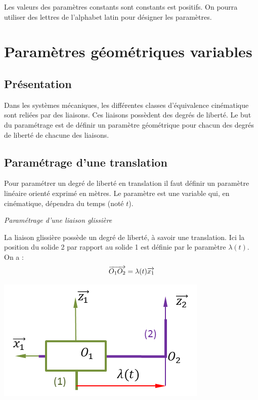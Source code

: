 \documentclass[10pt,oneside]{article}
\begin{document}
\begin{rem}
Les valeurs des paramètres constants sont constants est positifs. On pourra utiliser des lettres de l'alphabet latin pour désigner les paramètres. 
\end{rem}

\section{Paramètres géométriques variables}
\subsection{Présentation}
\begin{defi}
Dans les systèmes mécaniques, les différentes classes d'équivalence cinématique sont reliées par des liaisons. Ces liaisons possèdent des degrés de liberté. Le but du paramétrage est de définir un paramètre géométrique pour chacun des degrés de liberté de chacune des liaisons. 
\end{defi}

\subsection{Paramétrage d'une translation}

\begin{methode}
Pour paramétrer un degré de liberté en translation il faut définir un paramètre linéaire orienté exprimé en mètres. Le paramètre est une variable qui, en cinématique, dépendra du temps (noté $t$).
\end{methode}

\begin{exemple}
\textit{Paramétrage d'une liaison glissière}

\begin{minipage}[c]{.75\linewidth}
La liaison glissière possède un degré de liberté, à savoir une translation. Ici la position du solide 2 par rapport au solide 1 est définie par le paramètre $\lambda(t)$. On a : 
$$
\overrightarrow{O_1 O_2} = \lambda(t) \overrightarrow{x_1}
$$
\end{minipage} \hfill
\begin{minipage}[c]{.2\linewidth}
\begin{center}
\includegraphics[width=.95\textwidth]{png/glissiere_p}
\end{center}
\end{minipage}
\end{exemple}
\end{document}

